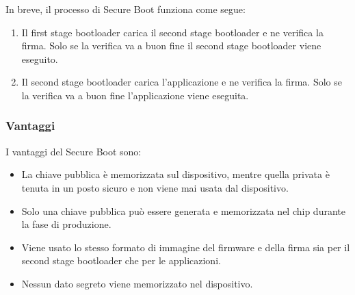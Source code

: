 \documentclass[a4paper]{article}
\begin{document}
\noindent
In breve, il processo
di Secure Boot funziona come segue:
\begin{enumerate}
  \item Il first stage bootloader carica il second stage bootloader e ne verifica la firma.
    Solo se la verifica va a buon fine il second stage bootloader viene eseguito.
  \item Il second stage bootloader carica l'applicazione e ne verifica la firma.
    Solo se la verifica va a buon fine l'applicazione viene eseguita.
\end{enumerate}

\subsubsection{Vantaggi}
I vantaggi del Secure Boot sono:
\begin{itemize}
  \item La chiave pubblica è memorizzata sul dispositivo, mentre quella privata è 
    tenuta in un posto sicuro e non viene mai usata dal dispositivo.

  \item Solo una chiave pubblica può essere generata e memorizzata nel chip
    durante la fase di produzione.

  \item Viene usato lo stesso formato di immagine del firmware e della firma sia
    per il second stage bootloader che per le applicazioni.

  \item Nessun dato segreto viene memorizzato nel dispositivo.
\end{itemize}
\end{document}
